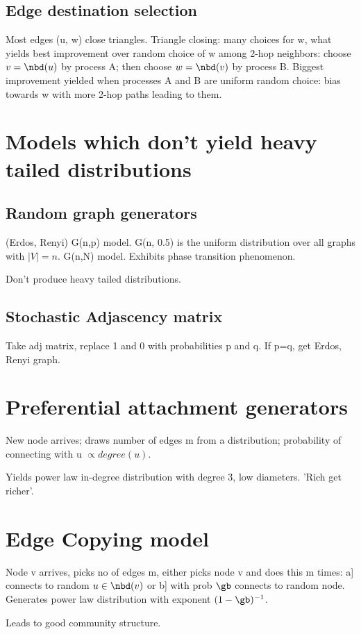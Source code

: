 \documentclass[oneside, article]{memoir}
\begin{document}
\subsection{Edge destination selection}
Most edges (u, w) close triangles. Triangle closing: many choices for w, what yields best improvement over random choice of w among 2-hop neighbors: choose $v=\nbd(u)$ by process A; then choose $w=\nbd(v)$ by process B. Biggest improvement yielded when processes A and B are uniform random choice: bias towards w with more 2-hop paths leading to them.

\section{Models which don't yield heavy tailed distributions}
\subsection{Random graph generators}
(Erdos, Renyi) G(n,p) model. G(n, 0.5) is the uniform distribution over all graphs with $|V|=n$. G(n,N) model. Exhibits phase transition phenomenon. \tbc

Don't produce heavy tailed distributions.

\subsection{Stochastic Adjascency matrix}
Take adj matrix, replace 1 and 0 with probabilities p and q. If p=q, get Erdos, Renyi graph.

\section{Preferential attachment generators}
New node arrives; draws number of edges m from a distribution; probability of connecting with u $\propto degree(u)$.

Yields power law in-degree distribution with degree 3, low diameters. 'Rich get richer'.

\section{Edge Copying model}
Node v arrives, picks no of edges m, either picks node v and does this m times: a] connects to random $u \in \nbd(v)$ or b] with prob $\gb$ connects to random node. Generates power law distribution with exponent $(1-\gb)^{-1}$.

Leads to good community structure.
\end{document}
